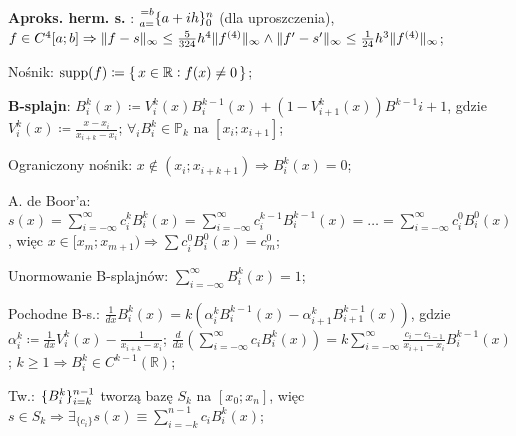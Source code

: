 \entry
\textbf{Aproks. herm. s. \mancube}:
$\ipoints[0][n][a=][=b]{a+ih}$
(dla uproszczenia),
$
f\in C^{4}[a;b]
\Rightarrow
\|f-s\|_\infty \leq \frac{5}{324} h^4 \|f^{(4)}\|_\infty
\wedge
\|f'-s'\|_\infty \leq \frac{1}{24} h^3 \|f^{(4)}\|_\infty
$;


\entry
Nośnik:
$\mathrm{supp}(f) \coloneqq \set{x \in \mathbb{R}: f(x) \neq 0}$;

\entry
\textbf{B-splajn}:
$B_i^k(x) \coloneqq V_i^k(x) B_i^{k-1}(x) + (1 - V^k_{i+1}(x)) B^{k-1}{i+1}$,
gdzie
$V_i^k(x) \coloneqq \frac{x-x_i}{x_{i+k} - x_i}$;
\entry
$\forall_i B_i^k \in \mathbb{P}_{k} \text{ na } [x_i; x_{i+1}]$;


\entry
Ograniczony nośnik:
$x \notin (x_i; x_{i+k+1}) \Rightarrow B^k_i(x)=0$;

\entry
A. de Boor'a:
$
s(x) =
\sum_{i=-\infty}^{\infty} c_i^k B^k_i (x) =
\sum_{i=-\infty}^{\infty} c_i^{k-1} B^{k-1}_i (x) =
\ldots =
\sum_{i=-\infty}^{\infty} c_i^{0} B^{0}_i (x)
$,
więc
$x\in [x_m; x_{m+1}) \Rightarrow \sum c^0_i B^0_i(x) = c_m^0$;

\entry
Unormowanie B-splajnów:
$\sum_{i = -\infty}^\infty B_i^k(x) = 1$;

\entry
Pochodne B-s.:
$\frac{1}{dx}B_i^k(x) = k (\alpha^k_i B_i^{k-1}(x) - \alpha^k_{i+1} B^{k-1}_{i+1}(x))$,
gdzie
$\alpha_i^k \coloneqq \frac{1}{dx}V_i^k(x) - \frac{1}{x_{i+k} - x_i}$;
\entry
$
\frac{d}{dx}(\sum_{i = -\infty}^\infty c_i B_i^k(x) ) =
k \sum_{i = -\infty}^\infty \frac{ c_i - c_{i-1} }{ x_{i+1} - x_i } B^{k-1}_i(x)
$;
\entry
$k \geq 1 \Rightarrow B_i^k \in C^{k-1}(\mathbb{R})$;

\entry
Tw.:
$\ipoints[i=k][n-1]{B_i^k}$
tworzą bazę $S_k$ na $[x_0; x_n]$,
więc
$s \in S_k \Rightarrow \exists_{\{c_i\}} s(x) \equiv \sum_{i=-k}^{n-1} c_i B_i^k(x)$;

